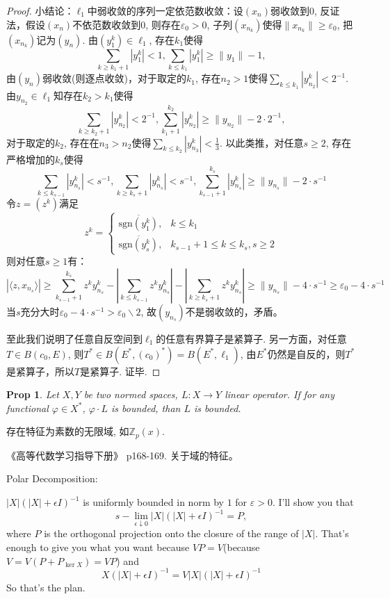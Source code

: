 \documentclass[a4paper,8pt]{ctexart}\textwidth 140mm \textheight 216mm
\newtheorem{Prop}{Prop}[section]
\newcommand{\e}{\varepsilon}
\newcommand{\8}{\infty}
\newcommand{\la}{\langle}
\newcommand{\ra}{\rangle}
\begin{document}
\begin{proof}
	小结论：$\ell_1$中弱收敛的序列一定依范数收敛：设$(x_n)$弱收敛到$0$, 反证法，假设$(x_n)$不依范数收敛到$0$, 则存在$\e_0>0$, 子列$(x_{n_k})$使得$\|x_{n_k}\|\geq \e_0$, 把$(x_{n_k})$记为$(y_n)$. 由$(y_1^k)\in \ell_1$, 存在$k_1$使得
	\[\sum_{k\geq k_1+1}|y_1^k|<1,\sum_{k\leq k_1}|y_1^k|\geq \|y_1\|-1,\]
	由$(y_n)$弱收敛(则逐点收敛)，对于取定的$k_1$, 存在$n_2> 1$使得$\sum_{k\leq k_1}|y_{n_2}^k|<2^{-1}$. 由$y_{n_2}\in\ell_1$知存在$k_2>k_1$使得
	\[\sum_{k\geq k_2+1}|y_{n_2}^k|<2^{-1},\sum_{k_1+1}^{k_2}|y_{n_2}^k|\geq \|y_{n_2}\|-2\cdot 2^{-1},\]
	对于取定的$k_2$, 存在在$n_3>n_2$使得$\sum_{k\leq k_2}|y_{n_3}^k|<\frac{1}{3}$. 
	以此类推，对任意$s\geq 2$, 存在严格增加的$k_s$使得
	\[\sum_{k\leq k_{s-1}}|y_{n_s}^k|<s^{-1}, \sum_{k\geq k_s+1}|y_{n_s}^k|<s^{-1}, \sum_{k_{s-1}+1}^{k_s}|y_{n_s}^k|\geq \|y_{n_s}\|-2\cdot s^{-1}\]
	令$z=(z^k)$满足
	\[
	z^k=\begin{cases}
	\overline{\mathrm{sgn}(y_1^k)}, &k\leq k_1\\
	\overline{\mathrm{sgn}(y_s^k)}, &k_{s-1}+1\leq k\leq k_s, s\geq 2
	\end{cases}
	\]
	则对任意$s\geq 1$有：
	\[|\la z,x_{n_s}\ra|\geq \sum_{k_{s-1}+1}^{k_s}z^ky_{n_s}^k-|\sum_{k\leq k_{s-1}}z^ky_{n_s}^k|-|\sum_{k\geq k_{s}+1}z^ky_{n_s}^k|\geq \|y_{n_s}\|-4\cdot s^{-1}\geq \e_0-4\cdot s^{-1}\]
	当$s$充分大时$\e_0-4\cdot s^{-1}>\e_0\backslash 2$, 故$(y_{n_s})$不是弱收敛的，矛盾。
	
	至此我们说明了任意自反空间到$\ell_1$的任意有界算子是紧算子. 另一方面，对任意$T\in B(c_0,E)$, 则$T^*\in B(E^*,(c_0)^*)=B(E^*,\ell_1)$, 由$E^*$仍然是自反的，则$T^*$是紧算子，所以$T$是紧算子. 证毕.
\end{proof}

\begin{Prop}
	Let $X,Y$ be two normed spaces, $L:X\to Y$ linear operator. If for any functional $\varphi\in X^*$, $\varphi\cdot L$ is bounded, than $L$ is bounded.
\end{Prop}



存在特征为素数的无限域, 如$\mathbb{Z}_p(x)$.

《高等代数学习指导下册》 p168-169. 关于域的特征。


Polar Decomposition:

$|X|(|X|+\epsilon I)^{-1}$ is uniformly bounded in norm by $1$ for $\e>0$. I'll show you that
\[s-\lim_{\epsilon\downarrow 0}|X|(|X|+\epsilon I)^{-1} = P,\]
where $P$ is the orthogonal projection onto the closure of the range of $|X|$. That's enough to give you what you want because $VP=V$(because $V=V(P+P_{\ker X})=VP$) and
\[X(|X|+\epsilon I)^{-1}=V|X|(|X|+\epsilon I)^{-1}\]
So that's the plan.
\end{document}
